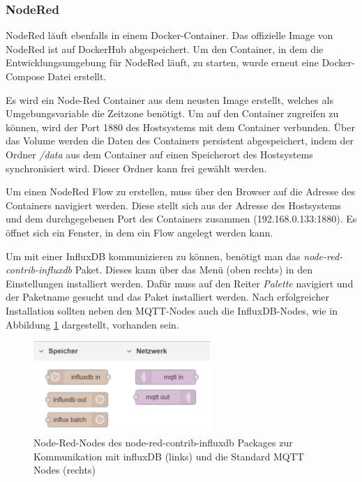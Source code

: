 \documentclass[a4paper, 12pt, oneside, toc=listofnumbered, bibliography=totoc]{scrbook}
\begin{document}
			\subsubsection{NodeRed}
			
			NodeRed läuft ebenfalls in einem Docker-Container. Das offizielle Image von NodeRed ist auf DockerHub abgespeichert. Um den Container, in dem die Entwicklungsumgebung für NodeRed läuft, zu starten, wurde erneut eine Docker-Compose Datei erstellt. 
			
			
			
			Es wird ein Node-Red Container aus dem neusten Image erstellt, welches als Umgebungsvariable die Zeitzone benötigt. Um auf den Container zugreifen zu können, wird der Port 1880 des Hostsystems mit dem Container verbunden. Über das Volume werden die Daten des Containers persistent abgespeichert, indem der Ordner \textit{/data} aus dem Container auf einen Speicherort des Hostsystems synchronisiert wird. Dieser Ordner kann frei gewählt werden.
			
			Um einen NodeRed Flow zu erstellen, muss über den Browser auf die Adresse des Containers navigiert werden. Diese stellt sich aus der Adresse des Hostsystems und dem durchgegebenen Port des Containers zusammen (192.168.0.133:1880). Es öffnet sich ein Fenster, in dem ein Flow angelegt werden kann.
			
			Um mit einer InfluxDB kommunizieren zu können, benötigt man das \textit{node-red-contrib-influxdb} Paket. Dieses kann über das Menü (oben rechts) in den Einstellungen installiert werden. Dafür muss auf den Reiter \textit{Palette} navigiert und der Paketname gesucht und das Paket installiert werden. Nach erfolgreicher Installation sollten neben den MQTT-Nodes auch die InfluxDB-Nodes, wie in Abbildung \ref{fig:nodes} dargestellt, vorhanden sein.
			
			\begin{figure}[H]
				\centering
				\includegraphics[width=0.6\textwidth]{res/NodeRedNodes.png}
				\caption{Node-Red-Nodes des node-red-contrib-influxdb Packages zur Kommunikation mit influxDB (links) und die Standard MQTT Nodes (rechts)}
				\label{fig:nodes}
			\end{figure}
		
\end{document}
